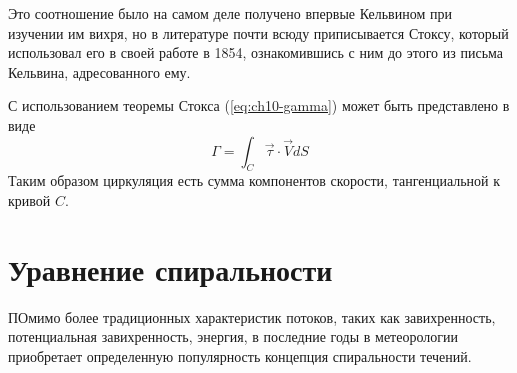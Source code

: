 \begin{info}
    Это соотношение было на самом деле получено впервые Кельвином при изучении им вихря, но в литературе почти всюду приписывается Стоксу, который использовал его в своей работе в 1854, ознакомившись с ним до этого из письма Кельвина, адресованного ему.
\end{info}

С использованием теоремы Стокса (\ref{eq:ch10-gamma}) может быть представлено в виде
\begin{equation}
    \label{eq:ch10-gamma1}
    \Gamma = \int_C \vec{\tau}\cdot\vec{V}dS
\end{equation}
Таким образом циркуляция есть сумма компонентов скорости, тангенциальной к кривой $C$.

\section{{\color{done}Уравнение спиральности}}
ПОмимо более традиционных характеристик потоков, таких как завихренность, потенциальная завихренность, энергия, в последние годы в метеорологии приобретает определенную популярность концепция спиральности течений. 

